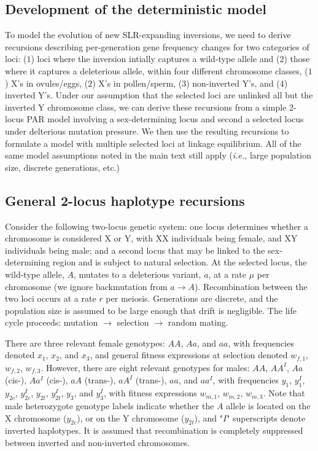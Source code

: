 \documentclass{article}
\begin{document}
\begin{appendices}
\section{Development of the deterministic model} \label{DetermModel-App}
 \renewcommand{\theequation}{B\arabic{equation}}
 \setcounter{equation}{0}
 \renewcommand{\thefigure}{B\arabic{figure}}
 \setcounter{figure}{0}

To model the evolution of new SLR-expanding inversions, we need to derive recursions describing per-generation gene frequency changes for two categories of loci: ($1$) loci where the inversion intially captures a wild-type allele and ($2$) those where it captures a deleterious allele, within four different chromosome classes, ($1$) X's in ovules/eggs, ($2$) X's in pollen/sperm, ($3$) non-inverted Y's, and ($4$) inverted Y's. Under our assumption that the selected loci are unlinked all but the inverted Y chromosome class, we can derive these recursions from a simple 2-locus PAR model involving a sex-determining locus and second a selected locus under delterious mutation pressure. We then use the resulting recursions to formulate a model with multiple selected loci at linkage equilibrium. All of the same model assumptions noted in the main text still apply ({\itshape i.e.}, large population size, discrete generations, etc.)


\subsection{General 2-locus haplotype recursions}

Consider the following two-locus genetic system: one locus determines whether a chromosome is considered X or Y, with XX individuals being female, and XY individuals being male; and a second locus that may be linked to the sex-determining region and is subject to natural selection. At the selected locus, the wild-type allele, $A$, mutates to a deleterious variant, $a$, at a rate $\mu$ per chromosome (we ignore backmutation from $a \rightarrow A$). Recombination between the two loci occurs at a rate $r$ per meiosis. Generations are discrete, and the population size is assumed to be large enough that drift is negligible. The life cycle proceeds: mutation $\rightarrow$ selection $\rightarrow$ random mating.

There are three relevant female genotypes: $AA$, $Aa$, and $aa$, with frequencies denoted $x_1$, $x_2$, and $x_3$, and general fitness expressions at selection denoted $w_{f,1}$, $w_{f,2}$, $w_{f,3}$. However, there are eight relevant genotypes for males: $AA$, $AA^I$, $Aa$ (cis-), $Aa^I$ (cis-), $aA$ (trans-), $aA^I$ (trans-), $aa$, and $aa^I$, with frequencies $y_{1}$, $y^I_{1}$, $y_{2c}$, $y^I_{2c}$, $y_{2t}$, $y^I_{2t}$, $y_{3}$, and $y^I_{3}$, with fitness expressions $w_{m,1}$, $w_{m,2}$, $w_{m,3}$. Note that male heterozygote genotype labels indicate whether the $A$ allele is located on the X chromosome ($y_{2c}$), or on the Y chromosome ($y_{2t}$), and "$I$" superscripts denote inverted haplotypes. It is assumed that recombination is completely suppressed between inverted and non-inverted chromosomes. 


\end{appendices}
\end{document}
